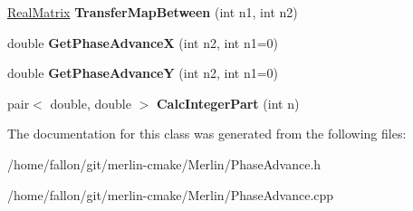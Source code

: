 \begin{DoxyCompactItemize}
\hyperlink{classTLAS_1_1Matrix}{Real\+Matrix} {\bfseries Transfer\+Map\+Between} (int n1, int n2)
\item 
\mbox{\label{classPhaseAdvance_a4ec2c1a5c219606aa52ad911a1c1099f}} 
double {\bfseries Get\+Phase\+AdvanceX} (int n2, int n1=0)
\item 
\mbox{\label{classPhaseAdvance_a0d2a2832c69f92c474e33e8aa31c7c3c}} 
double {\bfseries Get\+Phase\+AdvanceY} (int n2, int n1=0)
\item 
\mbox{\label{classPhaseAdvance_adcb18c08e79b26b104f5069ce4f7a7ae}} 
pair$<$ double, double $>$ {\bfseries Calc\+Integer\+Part} (int n)
\end{DoxyCompactItemize}


The documentation for this class was generated from the following files\+:\begin{DoxyCompactItemize}
\item 
/home/fallon/git/merlin-\/cmake/\+Merlin/Phase\+Advance.\+h\item 
/home/fallon/git/merlin-\/cmake/\+Merlin/Phase\+Advance.\+cpp\end{DoxyCompactItemize}
